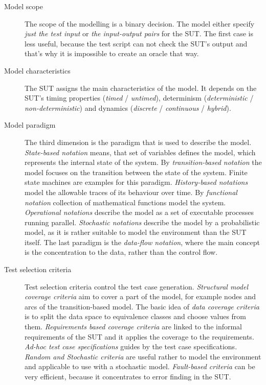 \documentclass{article}
\begin{document}
\begin{description}
	\item[Model scope] The scope of the modelling is a binary decision. The model either specify \textit{just the test input} or \textit{the input-output pairs} for the SUT. The first case is less useful, because the test script can not check the SUT's output and that's why it is impossible to create an oracle that way.
	
	\item[Model characteristics] The SUT assigns the main characteristics of the model. It depends on the SUT's timing properties (\textit{timed} / \textit{untimed}), determinism (\textit{deterministic} / \textit{non-deterministic}) and dynamics (\textit{discrete} / \textit{continuous} / \textit{hybrid}).
	
	\item[Model paradigm] The third dimension is the paradigm that is used to describe the model. \textit{State-based notation} means, that set of variables defines the model, which represents the internal state of the system. By \textit{transition-based notation} the model focuses on the transition between the state of the system. Finite state machines are examples for this paradigm. \textit{History-based notations} model the allowable traces of its behaviour over time. By \textit{functional notation} collection of mathematical functions model the system. \textit{Operational notations} describe the model as a set of executable processes running parallel. \textit{Stochastic notations} describe the model by a probabilistic model, as it is rather suitable to model the environment than the SUT itself. The last paradigm is the \textit{data-flow notation}, where the main concept is the concentration to the data, rather than the control flow.
	
	\item[Test selection criteria] Test selection criteria control the test case generation. \textit{Structural model coverage criteria} aim to cover a part of the model, for example nodes and arcs of the transition-based model. The basic idea of \textit{data coverage criteria} is to split the data space to equivalence classes and choose values from them. \textit{Requirements based coverage criteria} are linked to the informal requirements of the SUT and it applies the coverage to the requirements. \textit{Ad-hoc test case specifications} guides by the test case specifications. \textit{Random and Stochastic criteria} are useful rather to model the environment and applicable to use with a stochastic model. \textit{Fault-based criteria} can be very efficient, because it concentrates to error finding in the SUT.
	

\end{description}
\end{document}
